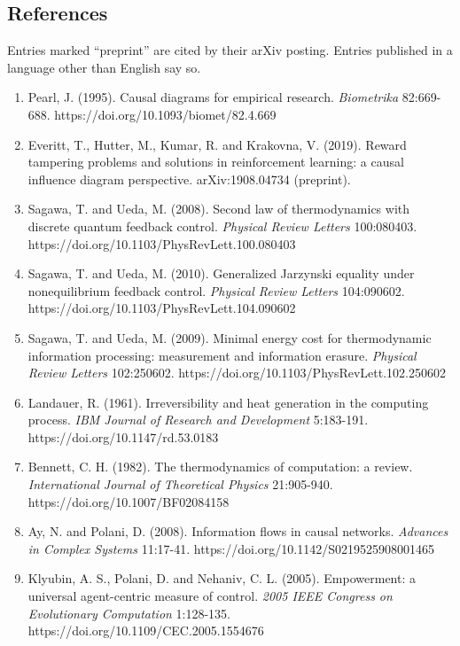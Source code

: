\documentclass[
  10pt,
]{article}
\newcounter{none} %
\providecommand{\tightlist}{%
  \setlength{\itemsep}{0pt}\setlength{\parskip}{0pt}}
\begin{document}
\subsection{References}\label{references}

Entries marked ``preprint'' are cited by their arXiv posting. Entries
published in a language other than English say so.

\begin{enumerate}
\def\labelenumi{\arabic{enumi}.}
\tightlist
\item
  Pearl, J. (1995). Causal diagrams for empirical research.
  \emph{Biometrika} 82:669-688. https://doi.org/10.1093/biomet/82.4.669
\item
  Everitt, T., Hutter, M., Kumar, R. and Krakovna, V. (2019). Reward
  tampering problems and solutions in reinforcement learning: a causal
  influence diagram perspective. arXiv:1908.04734 (preprint).
\item
  Sagawa, T. and Ueda, M. (2008). Second law of thermodynamics with
  discrete quantum feedback control. \emph{Physical Review Letters}
  100:080403. https://doi.org/10.1103/PhysRevLett.100.080403
\item
  Sagawa, T. and Ueda, M. (2010). Generalized Jarzynski equality under
  nonequilibrium feedback control. \emph{Physical Review Letters}
  104:090602. https://doi.org/10.1103/PhysRevLett.104.090602
\item
  Sagawa, T. and Ueda, M. (2009). Minimal energy cost for thermodynamic
  information processing: measurement and information erasure.
  \emph{Physical Review Letters} 102:250602.
  https://doi.org/10.1103/PhysRevLett.102.250602
\item
  Landauer, R. (1961). Irreversibility and heat generation in the
  computing process. \emph{IBM Journal of Research and Development}
  5:183-191. https://doi.org/10.1147/rd.53.0183
\item
  Bennett, C. H. (1982). The thermodynamics of computation: a review.
  \emph{International Journal of Theoretical Physics} 21:905-940.
  https://doi.org/10.1007/BF02084158
\item
  Ay, N. and Polani, D. (2008). Information flows in causal networks.
  \emph{Advances in Complex Systems} 11:17-41.
  https://doi.org/10.1142/S0219525908001465
\item
  Klyubin, A. S., Polani, D. and Nehaniv, C. L. (2005). Empowerment: a
  universal agent-centric measure of control. \emph{2005 IEEE Congress
  on Evolutionary Computation} 1:128-135.
  https://doi.org/10.1109/CEC.2005.1554676

\end{enumerate}
\end{document}
